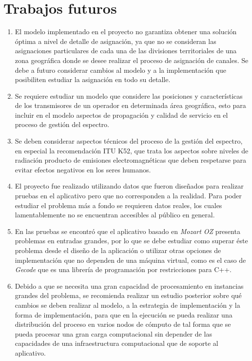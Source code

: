 \section{Trabajos futuros}
\begin{enumerate}
	\item El modelo implementado en el proyecto no garantiza obtener una solución óptima a nivel de detalle de asignación, ya que no se consideran las asignaciones particulares de cada una de las divisiones territoriales de una zona geográfica donde se desee realizar el proceso de asignación de canales. Se debe a futuro considerar cambios al modelo y a la implementación que posibiliten estudiar la asignación en todo su detalle.
	\item Se requiere estudiar un modelo que considere las posiciones y características de los transmisores de un operador en determinada área geográfica, esto para incluir en el modelo aspectos de propagación y calidad de servicio en el proceso de gestión del espectro.
	\item Se deben considerar aspectos técnicos del proceso de la gestión del espectro, en especial la recomendación ITU K52, que trata los aspectos sobre niveles de radiación producto de emisiones electromagnéticas que deben respetarse para evitar efectos negativos en los seres humanos.
	\item El proyecto fue realizado utilizando datos que fueron diseñados para realizar pruebas en el aplicativo pero que no corresponden a la realidad. Para poder estudiar el problema más a fondo se requieren datos reales, los cuales lamentablemente no se encuentran accesibles al público en general.
	\item En las pruebas se encontró que el aplicativo basado en \textit{Mozart OZ} presenta problemas en entradas grandes, por lo que se debe estudiar como superar éste problema desde el diseño de la aplicación o utilizar otras opciones de implementación que no dependen de una máquina virtual, como es el caso de \textit{Gecode} que es una librería de programación por restricciones para C++.
	\item Debido a que se necesita una gran capacidad de procesamiento en instancias grandes del problema, se recomienda realizar un estudio posterior sobre qué cambios se deben realizar al modelo, a la estrategia de implementación y la forma de implementación, para que en la ejecución se pueda realizar una distribución del proceso en varios nodos de cómputo de tal forma que se pueda procesar una gran carga computacional sin depender de las capacidades de una infraestructura computacional que de soporte al aplicativo.
\end{enumerate}












